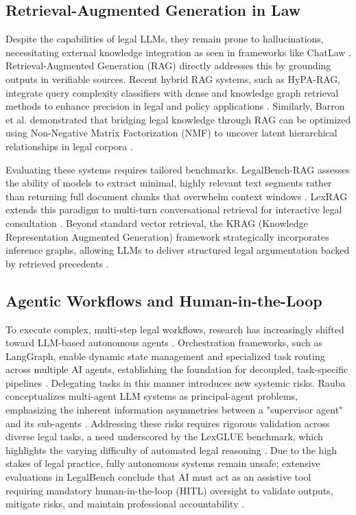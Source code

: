 \subsection{Retrieval-Augmented Generation in Law}
Despite the capabilities of legal LLMs, they remain prone to hallucinations, necessitating external knowledge integration as seen in frameworks like ChatLaw \cite{cui2023chatlaw}. Retrieval-Augmented Generation (RAG) directly addresses this by grounding outputs in verifiable sources. Recent hybrid RAG systems, such as HyPA-RAG, integrate query complexity classifiers with dense and knowledge graph retrieval methods to enhance precision in legal and policy applications \cite{kalra2024hypa}. Similarly, Barron et al. demonstrated that bridging legal knowledge through RAG can be optimized using Non-Negative Matrix Factorization (NMF) to uncover latent hierarchical relationships in legal corpora \cite{barron2025bridging}. 

Evaluating these systems requires tailored benchmarks. LegalBench-RAG assesses the ability of models to extract minimal, highly relevant text segments rather than returning full document chunks that overwhelm context windows \cite{pipitone2024legalbench}. LexRAG extends this paradigm to multi-turn conversational retrieval for interactive legal consultation \cite{li2025lexrag}. Beyond standard vector retrieval, the KRAG (Knowledge Representation Augmented Generation) framework strategically incorporates inference graphs, allowing LLMs to deliver structured legal argumentation backed by retrieved precedents \cite{thanh2024krag}.

\subsection{Agentic Workflows and Human-in-the-Loop}
To execute complex, multi-step legal workflows, research has increasingly shifted toward LLM-based autonomous agents \cite{xi2023rise}. Orchestration frameworks, such as LangGraph, enable dynamic state management and specialized task routing across multiple AI agents, establishing the foundation for decoupled, task-specific pipelines \cite{wang2024agent}. Delegating tasks in this manner introduces new systemic risks. Rauba conceptualizes multi-agent LLM systems as principal-agent problems, emphasizing the inherent information asymmetries between a "supervisor agent" and its sub-agents \cite{rauba2026multi}. Addressing these risks requires rigorous validation across diverse legal tasks, a need underscored by the LexGLUE benchmark, which highlights the varying difficulty of automated legal reasoning \cite{chalkidis2022lexglue}. Due to the high stakes of legal practice, fully autonomous systems remain unsafe; extensive evaluations in LegalBench conclude that AI must act as an assistive tool requiring mandatory human-in-the-loop (HITL) oversight to validate outputs, mitigate risks, and maintain professional accountability \cite{guha2023legalbench}.


